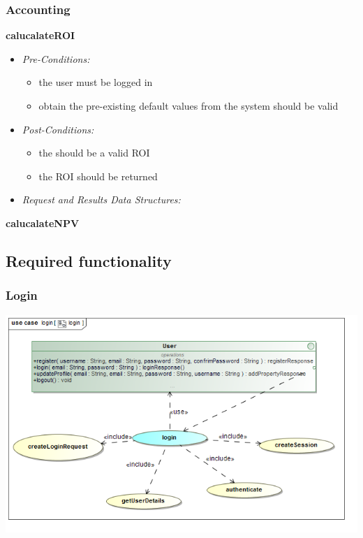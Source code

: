 \documentclass[a4paper,12pt]{article}
\begin{document}
\subsubsection{Accounting}
\textbf{{calucalateROI}}
	\begin{itemize}
		\item \textit{Pre-Conditions:}
		\begin{itemize}
		\item the user must be logged in
		\item obtain the pre-existing default values from the system should be valid
		\end{itemize}
		\item \textit{Post-Conditions:}
		\begin{itemize}
		\item the should be a valid ROI
		\item the ROI should be returned 
		\end{itemize}
		\item \textit{Request and Results Data Structures:}
	\end{itemize}
\textbf{{calucalateNPV}}

\subsection{Required functionality}
\subsubsection{Login}
\includegraphics[width=1\textwidth]{./Images/newDiagrams/requiredFunctionality/Diana/login.png}
\end{document}
